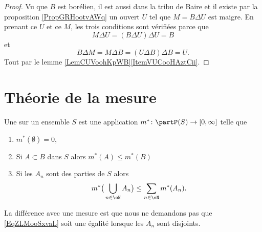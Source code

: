 \begin{proof}
    Vu que \( B\) est borélien, il est aussi dans la tribu de Baire et il existe par la proposition \ref{PropGRHootvAWq} un ouvert \( U\) tel que \( M=B\Delta U\) est maigre. En prenant ce \( U\) et ce \( M\), les trois conditions sont vérifiées parce que
    \begin{equation}
        M\Delta U=(B\Delta U)\Delta U=B
    \end{equation}
    et
    \begin{equation}
        B\Delta M=M\Delta B=(U\Delta B)\Delta B=U.
    \end{equation}
    Tout par le lemme \ref{LemCUVoohKpWB}\ref{ItemVUCooHAztCii}.
\end{proof}

\section{Théorie de la mesure}
\label{SecSLOooeMaig}

\begin{definition} \label{DefUMWoolmMaf}
    Une  sur un ensemble \( S\) est une application \( m^*\colon \partP(S)\to \mathopen[ 0 , \infty \mathclose]\) telle que
    \begin{enumerate}
        \item
            \( m^*(\emptyset)=0\),
        \item
            Si \( A\subset B\) dans \( S\) alors \( m^*(A)\leq m^*(B)\)
        \item   \label{ItemARKooppZfDaiii}
            Si les \( A_n\) sont des parties de \( S\) alors
            \begin{equation}    \label{EqZLMooSxvaL}
                m^*\big( \bigcup_{n\in \eN}A_n \big)\leq \sum_{n\in \eN}m^*(A_n).
            \end{equation}
    \end{enumerate}
\end{definition}
La différence avec une mesure est que nous ne demandons pas que \eqref{EqZLMooSxvaL} soit une égalité lorsque les \( A_n\) sont disjoints.

